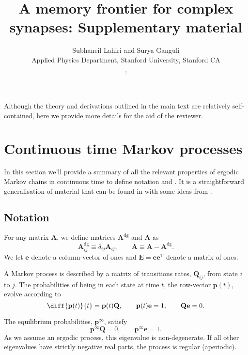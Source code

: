 \documentclass{article} %
\title{A memory frontier for complex synapses: Supplementary material}
\author{Subhaneil Lahiri and Surya Ganguli\\
Applied Physics Department, Stanford University, Stanford CA\\
\emaillink{sulahiri@stanford.edu}, \emaillink{sulahiri@stanford.edu}
%
}
\newcommand{\dg}{^\mathrm{dg}}
\newcommand{\trans}{^\mathrm{T}}
\newcommand{\onev}{\mathbf{e}}
\newcommand{\onem}{\mathbf{E}}
\newcommand{\MM}{\mathbf{Q}}
\newcommand{\pr}{\mathbf{p}}
\newcommand{\eq}{\pr^\infty}
\begin{document}
\maketitle



Although the theory and derivations outlined in the main text are relatively self-contained, here we provide more details for the aid of the reviewer.

\section{Continuous time Markov processes}\label{sec:ContMarkov}

In this section we'll provide a summary of all the relevant properties of ergodic Markov chains in continuous time to define notation and .
It is a straightforward generalisation of material that can be found in \cite{kemeny1960finite} with some ideas from \cite{hunter2000survey}.


\subsection{Notation}\label{sec:not}

For any matrix $\mathbf{A}$, we define matrices $\mathbf{A}\dg$ and $\overline{\mathbf{A}}$ as
%
\begin{equation}\label{eq:dgdef}
  \mathbf{A}\dg_{ij} \equiv \delta_{ij}\mathbf{A}_{ij},
  \qquad
  \overline{\mathbf{A}} \equiv \mathbf{A}-\mathbf{A}\dg.
\end{equation}
%
We let $\onev$ denote a column-vector of ones and $\onem=\onev\onev\trans$ denote a matrix of ones.


A Markov process is described by a matrix of transitions rates, $\MM_{ij}$, from state $i$ to $j$.
The probabilities of being in each state at time $t$, the row-vector $\mathbf{p}(t)$, evolve according to
%
\begin{equation}\label{eq:rowsum}
  \diff{\mathbf{p}(t)}{t} = \mathbf{p}(t) \MM,
  \qquad
  \mathbf{p}(t)\onev=1,
  \qquad
  \MM\onev=0.
\end{equation}
%

The equilibrium probabilities, $\eq$, satisfy
%
\begin{equation}\label{eq:equilibrium}
  \eq\MM=0,
  \qquad
  \eq\onev=1.
\end{equation}
%
As we assume an ergodic process, this eigenvalue is non-degenerate.
If all other eigenvalues have strictly negative real parts, the process is regular (aperiodic).
\end{document}
